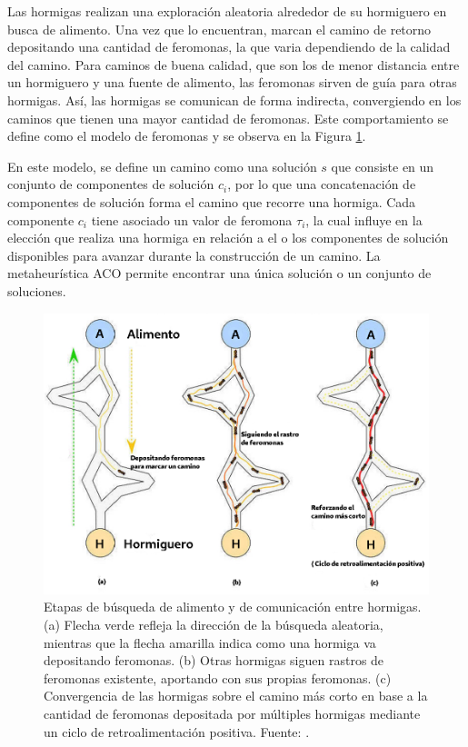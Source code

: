 Las hormigas realizan una exploraci\'on aleatoria alrededor de su hormiguero en busca de alimento. Una vez que lo encuentran, marcan el camino de retorno depositando una cantidad de feromonas, la que varia dependiendo de la calidad del camino. Para caminos de buena calidad, que son los de menor distancia entre un hormiguero y una fuente de alimento, las feromonas sirven de guía para otras hormigas. As\'i, las hormigas se comunican de forma indirecta, convergiendo en los caminos que tienen una mayor cantidad de feromonas. Este comportamiento se define como el modelo de feromonas y se observa en la Figura \ref{fig:hormigas}.


En este modelo, se define un camino como una soluci\'on $s$ que consiste en un conjunto de componentes de soluci\'on $c_{i}$, por lo que una concatenaci\'on de componentes de soluci\'on forma el camino que recorre una hormiga. Cada componente $c_{i}$ tiene asociado un valor de feromona $\tau_i$, la cual influye en la elecci\'on que realiza una hormiga en relaci\'on a el o los componentes de soluci\'on disponibles para avanzar durante la construcci\'on de un camino. La metaheur\'istica ACO permite encontrar una \'unica soluci\'on o un conjunto de soluciones. 


\begin{figure}[h]
    \centering
    \includegraphics[scale=0.5]{imagenes/ACO-ant.png}
    \caption[Etapas de b\'usqueda de alimento y de comunicaci\'on entre hormigas.]{Etapas de b\'usqueda de alimento y de comunicaci\'on entre hormigas. (a) Flecha verde refleja la direcci\'on de la  b\'usqueda aleatoria, mientras que la flecha amarilla indica como una hormiga va depositando feromonas. (b) Otras hormigas siguen rastros de feromonas existente, aportando con sus propias feromonas. (c) Convergencia de las hormigas sobre el camino m\'as corto en base a la cantidad de feromonas depositada por m\'ultiples hormigas mediante un ciclo de retroalimentaci\'on positiva. Fuente: \citet{liu2020improving}.}
    \label{fig:hormigas}
\end{figure}

